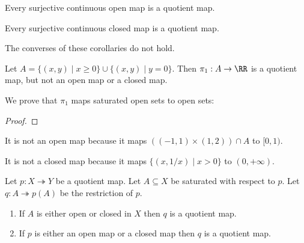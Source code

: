 \begin{corollary}
    \label{corollary:quotient_continuous_open}
    Every surjective continuous open map is a quotient map.
\end{corollary}

\begin{corollary}
    \label{corollary:closed_map_quotient}
    Every surjective continuous closed map is a quotient map.
\end{corollary}

\begin{example}
    The converses of these corollaries do not hold.

    Let $A = \{ (x,y) \mid x \geq 0 \} \cup \{ (x,y) \mid y = 0 \}$. Then $\pi_1 : A \rightarrow \RR$ is a quotient map, but not an open map or a closed map.

    We prove that $\pi_1$ maps saturated open sets to open sets:
    \begin{proof}
    \end{proof}

    It is not an open map because it maps $((-1,1) \times (1,2)) \cap A$ to $[0,1)$.

    It is not a closed map because it maps $\{ (x, 1/x) \mid x > 0 \}$ to $(0, +\infty)$.
\end{example}

\begin{proposition}
    \label{proposition:quotient_restriction}
    Let $p : X \twoheadrightarrow Y$ be a quotient map. Let $A \subseteq X$ be saturated with respect to $p$. Let $q : A \twoheadrightarrow p(A)$ be the restriction of $p$.
    \begin{enumerate}
        \item If $A$ is either open or closed in $X$ then $q$ is a quotient map.
        \item If $p$ is either an open map or a closed map then $q$ is a quotient map.
    \end{enumerate}
\end{proposition}

